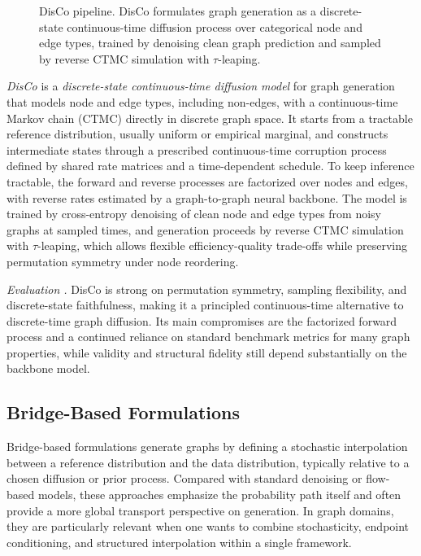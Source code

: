 \documentclass{article}
\begin{document}
\begin{figure}[htbp]
\caption{DisCo pipeline. DisCo formulates graph generation as a discrete-state continuous-time diffusion process over categorical node and edge types, trained by denoising clean graph prediction and sampled by reverse CTMC simulation with $\tau$-leaping.}
\label{fig:disco_pipeline}
\end{figure}

\emph{DisCo} \cite{xu2024discrete} is a \emph{discrete-state continuous-time diffusion model} for graph generation that models node and edge types, including non-edges, with a continuous-time Markov chain (CTMC) directly in discrete graph space. It starts from a tractable reference distribution, usually uniform or empirical marginal, and constructs intermediate states through a prescribed continuous-time corruption process defined by shared rate matrices and a time-dependent schedule. To keep inference tractable, the forward and reverse processes are factorized over nodes and edges, with reverse rates estimated by a graph-to-graph neural backbone. The model is trained by cross-entropy denoising of clean node and edge types from noisy graphs at sampled times, and generation proceeds by reverse CTMC simulation with 
$\tau$-leaping, which allows flexible efficiency-quality trade-offs while preserving permutation symmetry under node reordering.


\emph{Evaluation .} DisCo is strong on permutation symmetry, sampling flexibility, and discrete-state faithfulness, making it a principled continuous-time alternative to discrete-time graph diffusion. Its main compromises are the factorized forward process and a continued reliance on standard benchmark metrics for many graph properties, while validity and structural fidelity still depend substantially on the backbone model.

\subsection{Bridge-Based Formulations}
\label{sec:bridge_models}

Bridge-based formulations generate graphs by defining a stochastic interpolation between a reference distribution and the data distribution, typically relative to a chosen diffusion or prior process. Compared with standard denoising or flow-based models, these approaches emphasize the probability path itself and often provide a more global transport perspective on generation. In graph domains, they are particularly relevant when one wants to combine stochasticity, endpoint conditioning, and structured interpolation within a single framework.
\end{document}
